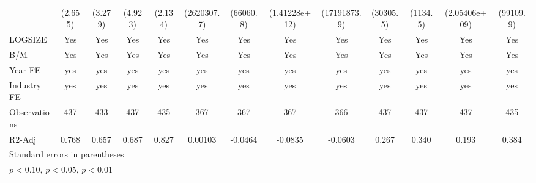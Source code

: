 \begin{table}[htbp]
\begin{tabular}{l*{12}{c}}
                    &     (2.655)         &     (3.279)         &     (4.923)         &     (2.134)         & (2620307.7)         &   (66060.8)         &(1.41228e+12)         &(17191873.9)         &   (30305.5)         &    (1134.5)         &(2.05406e+09)         &   (99109.9)         \\
[1em]
LOGSIZE             &         Yes         &         Yes         &         Yes         &         Yes         &         Yes         &         Yes         &         Yes         &         Yes         &         Yes         &         Yes         &         Yes         &         Yes         \\
[1em]
B/M                 &         Yes         &         Yes         &         Yes         &         Yes         &         Yes         &         Yes         &         Yes         &         Yes         &         Yes         &         Yes         &         Yes         &         Yes         \\
\hline
Year FE             &         yes         &         yes         &         yes         &         yes         &         yes         &         yes         &         yes         &         yes         &         yes         &         yes         &         yes         &         yes         \\
Industry FE         &         yes         &         yes         &         yes         &         yes         &         yes         &         yes         &         yes         &         yes         &         yes         &         yes         &         yes         &         yes         \\
Observations        &         437         &         433         &         437         &         435         &         367         &         367         &         367         &         366         &         437         &         437         &         437         &         435         \\
R2-Adj              &       0.768         &       0.657         &       0.687         &       0.827         &     0.00103         &     -0.0464         &     -0.0835         &     -0.0603         &       0.267         &       0.340         &       0.193         &       0.384         \\
\hline\hline
\multicolumn{13}{l}{\footnotesize Standard errors in parentheses}\\
\multicolumn{13}{l}{\footnotesize \sym{*} \(p<0.10\), \sym{**} \(p<0.05\), \sym{***} \(p<0.01\)}\\
\end{tabular}
\end{table}
